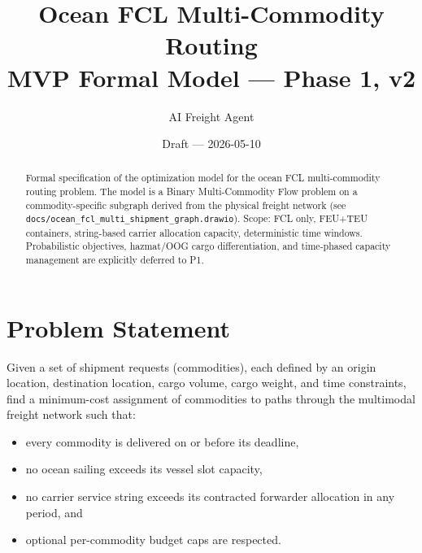 \documentclass[11pt,a4paper]{article}
\title{\textbf{Ocean FCL Multi-Commodity Routing}\\[0.4em]
\large MVP Formal Model --- Phase 1, v2}
\author{AI Freight Agent}
\date{Draft --- 2026-05-10}
\theoremstyle{definition}
\begin{document}
\maketitle

\begin{abstract}
Formal specification of the optimization model for the ocean FCL multi-commodity routing
problem. The model is a Binary Multi-Commodity Flow problem on a commodity-specific
subgraph derived from the physical freight network
(see \texttt{docs/ocean\_fcl\_multi\_shipment\_graph.drawio}).
Scope: FCL only, FEU+TEU containers, string-based carrier allocation capacity, deterministic
time windows. Probabilistic objectives, hazmat/OOG cargo differentiation, and time-phased
capacity management are explicitly deferred to P1.
\end{abstract}

\tableofcontents
\newpage

\section{Problem Statement}

Given a set of shipment requests (commodities), each defined by an origin location,
destination location, cargo volume, cargo weight, and time constraints, find a
minimum-cost assignment of commodities to paths through the multimodal freight network such that:
\begin{itemize}[noitemsep]
  \item every commodity is delivered on or before its deadline,
  \item no ocean sailing exceeds its vessel slot capacity,
  \item no carrier service string exceeds its contracted forwarder allocation in any period, and
  \item optional per-commodity budget caps are respected.
\end{itemize}
\end{document}
